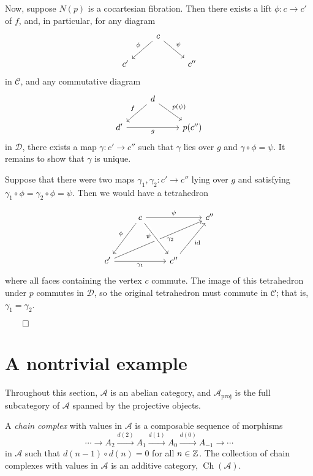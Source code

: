 \documentclass{MetricNotes2023}
\def\inte{\ensuremath\mathbb{Z}}
\def\id{\ensuremath\text{id}}
\DeclareMathOperator{\Ch}{Ch}
\def\done{\begin{flushright}\vspace{-4.35ex}\(\qed\)\end{flushright}}
\begin{document}
\begin{ourproof}
Now, suppose \(N(p)\) is a cocartesian fibration. Then there exists a lift \(\phi : c \to c'\) of \(f\), and, in particular, for any diagram
\[\begin{tikzcd}
& c \arrow[dl, swap, "\phi"] \arrow[dr, "\psi"]  & \\
c'  & & c''
\end{tikzcd}\]
in \(\mathcal{C}\), and any commutative diagram
\[\begin{tikzcd}
& d \arrow[dl, swap, "f"] \arrow[dr, "p(\psi)"]  & \\
d' \arrow[rr, swap, "g"] & & p(c'')
\end{tikzcd}\]
in \(\mathcal{D}\), there exists a map \(\gamma : c'\to c''\) such that \(\gamma\) lies over \(g\) and \(\gamma \circ \phi = \psi\). It remains to show that \(\gamma\) is unique. 

Suppose that there were two maps \(\gamma_1, \gamma_2 : c' \to c''\) lying over \(g\) and satisfying \(\gamma_1\circ\phi = \gamma_2 \circ \phi = \psi\). Then we would have a tetrahedron 

\[\begin{tikzcd}
& c \arrow[rr, "\psi"] \arrow[ddl, swap, "\phi"]  & & c'' \\
& & & \\
c' \arrow[rr, swap, "\gamma_1"] \arrow[rrruu, swap, "\gamma_2" {xshift=8pt, yshift=5pt}] & & c'' \arrow[ruu, swap, "\id"] \arrow[from=luu, swap, crossing over, "\psi" {xshift=-4pt, yshift=8pt}] & 
\end{tikzcd}\]
where all faces containing the vertex \(c\) commute. The image of this tetrahedron under \(p\) commutes in \(\mathcal{D}\), so the original tetrahedron must commute in \(\mathcal{C}\); that is, \(\gamma_1=\gamma_2\).\done

\section{A nontrivial example}

Throughout this section, \(\mathcal{A}\) is an abelian category, and \(\mathcal{A}_{\text{proj}}\) is the full subcategory of \(\mathcal{A}\) spanned by the projective objects. 

\begin{definition}
A \textit{chain complex} with values in \(\mathcal{A}\) is a composable sequence of morphisms 
\[\cdots \to A_2 \xrightarrow{d(2)} A_1 \xrightarrow{d(1)}A_0 \xrightarrow{d(0)} A_{-1}\to \cdots\]
in \(\mathcal{A}\) such that \(d(n-1)\circ d(n)=0\) for all \(n \in \inte\). The collection of chain complexes with values in \(\mathcal{A}\) is an additive category, \(\Ch(\mathcal{A})\). 
\end{definition}


\end{ourproof}
\end{document}
